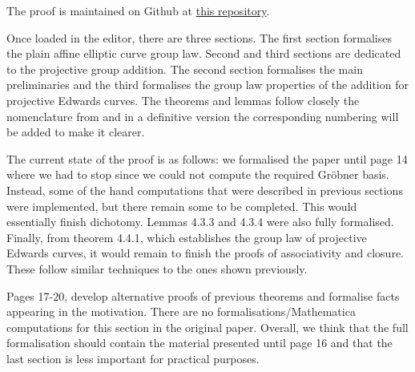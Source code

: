 The proof is maintained on Github at \href{https://github.com/rjraya/Isabelle/blob/master/curves/Hales.thy}{this repository}.

Once loaded in the editor, there are three sections. The first section formalises the plain affine elliptic curve group law. Second and third sections are dedicated to the projective group addition. The second section formalises the main preliminaries and the third formalises the group law properties of the addition for projective Edwards curves. The theorems and lemmas follow closely the nomenclature from \cite{hales2016group} and in a definitive version the corresponding numbering will be added to make it clearer. 

The current state of the proof is as follows: we formalised the paper until page 14 where we had to stop since we could not compute the required Gröbner basis. Instead, some of the hand computations that were described in previous sections were implemented, but there remain some to be completed. This would essentially finish dichotomy. Lemmas 4.3.3 and 4.3.4 were also fully formalised. Finally, from theorem 4.4.1, which establishes the group law of projective Edwards curves, it would remain to finish the proofs of associativity and closure. These follow similar techniques to the ones shown previously.

Pages 17-20, develop alternative proofs of previous theorems and formalise facts appearing in the motivation. There are no formalisations/Mathematica computations for this section in the original paper. Overall, we think that the full formalisation should contain the material presented until page 16 and that the last section is less important for practical purposes.



